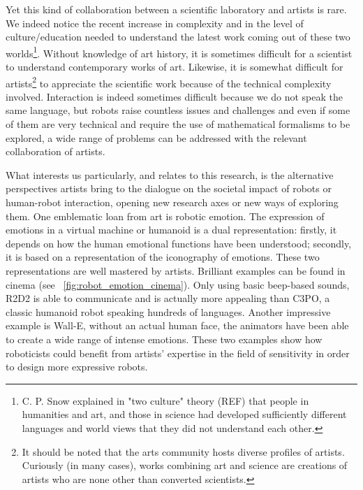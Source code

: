 \begin{figure}[!tb]
\centering
    \hfil
    \caption{}
    \label{fig:ergo_robot}
\end{figure}


Yet this kind of collaboration between a scientific laboratory and artists is rare.
We indeed notice the recent increase in complexity and in the level of culture/education needed to understand the latest work coming out of these two worlds\footnote{C. P. Snow explained in "two culture" theory (REF) that people in humanities and art, and those in science had developed sufficiently different languages and world views that they did not understand each other.}. Without knowledge of art history, it is sometimes difficult for a scientist to understand contemporary works of art. Likewise, it is somewhat difficult for artists\footnote{It should be noted that the arts community hosts diverse profiles of artists. Curiously (in many cases), works combining art and science are creations of artists who are none other than converted scientists.} to appreciate the scientific work because of the technical complexity involved.
Interaction is indeed sometimes difficult because we do not speak the same language, but robots raise countless issues and challenges and even if some of them are very technical and require the use of mathematical formalisms to be explored, a wide range of problems can be addressed with the relevant collaboration of artists.

What interests us particularly, and relates to this research, is the alternative perspectives artists bring to the dialogue on  the societal impact of robots or human-robot interaction, opening new research axes or new ways of exploring them.
One emblematic  loan  from art is robotic emotion. The expression of emotions in a virtual machine or humanoid is a dual representation: firstly, it depends on how the human emotional functions have been understood; secondly, it is based on a representation of the iconography of emotions. These two representations are well mastered by artists. Brilliant examples can be found in cinema (see \figurename~\ref{fig:robot_emotion_cinema}). Only using basic beep-based sounds, R2D2 is able to communicate and is actually more appealing than C3PO, a classic humanoid robot speaking hundreds of languages. Another impressive example is Wall-E, without an actual human face, the animators have been able to create a wide range of intense emotions.
These two examples show how roboticists could benefit from artists’ expertise in the field of sensitivity in order to design more expressive robots.


